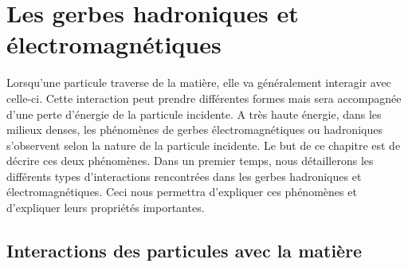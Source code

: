 \chapter{Les gerbes hadroniques et électromagnétiques}
\label{chap.shower}
Lorsqu'une particule traverse de la matière, elle va généralement interagir avec celle-ci. Cette interaction peut prendre différentes formes mais sera accompagnée d'une perte d'énergie de la particule incidente. A très haute énergie, dans les milieux denses, les phénomènes de gerbes électromagnétiques ou hadroniques s'observent selon la nature de la particule incidente. Le but de ce chapitre est de décrire ces deux phénomènes. Dans un premier temps, nous détaillerons les différents types d'interactions rencontrées dans les gerbes hadroniques et électromagnétiques. Ceci nous permettra d'expliquer ces phénomènes et d'expliquer leurs propriétés importantes.
\minitoc
\newpage


\section{Interactions des particules avec la matière}
\label{sec.particle_in_matter}
